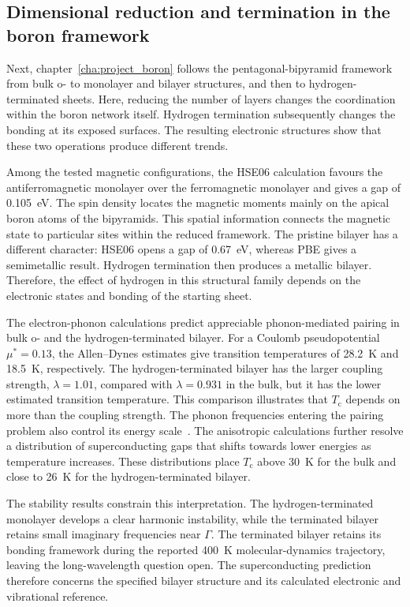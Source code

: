 \FloatBarrier
\subsection{Dimensional reduction and termination in the boron framework}

Next, chapter~\ref{cha:project_boron} follows the pentagonal-bipyramid framework from bulk o- to monolayer and bilayer structures, and then to hydrogen-terminated sheets.
Here, reducing the number of layers changes the coordination within the boron network itself.
Hydrogen termination subsequently changes the bonding at its exposed surfaces.
The resulting electronic structures show that these two operations produce different trends.

Among the tested magnetic configurations, the HSE06 calculation favours the antiferromagnetic monolayer over the ferromagnetic monolayer and gives a gap of \qty{0.105}{\electronvolt}.
The spin density locates the magnetic moments mainly on the apical boron atoms of the bipyramids.
This spatial information connects the magnetic state to particular sites within the reduced framework.
The pristine bilayer has a different character: HSE06 opens a gap of \qty{0.67}{\electronvolt}, whereas PBE gives a semimetallic result.
Hydrogen termination then produces a metallic bilayer.
Therefore, the effect of hydrogen in this structural family depends on the electronic states and bonding of the starting sheet.

The electron-phonon calculations predict appreciable phonon-mediated pairing in bulk o- and the hydrogen-terminated bilayer.
For a Coulomb pseudopotential $\mu^*=0.13$, the Allen--Dynes estimates give transition temperatures of \qty{28.2}{\kelvin} and \qty{18.5}{\kelvin}, respectively.
The hydrogen-terminated bilayer has the larger coupling strength, $\lambda=1.01$, compared with $\lambda=0.931$ in the bulk, but it has the lower estimated transition temperature.
This comparison illustrates that $T_{\mathrm{c}}$ depends on more than the coupling strength.
The phonon frequencies entering the pairing problem also control its energy scale~\cite{allen-dynes}.
The anisotropic calculations further resolve a distribution of superconducting gaps that shifts towards lower energies as temperature increases.
These distributions place $T_{\mathrm{c}}$ above \qty{30}{\kelvin} for the bulk and close to \qty{26}{\kelvin} for the hydrogen-terminated bilayer.

The stability results constrain this interpretation.
The hydrogen-terminated monolayer develops a clear harmonic instability, while the terminated bilayer retains small imaginary frequencies near $\Gamma$.
The terminated bilayer retains its bonding framework during the reported \qty{400}{\kelvin} molecular-dynamics trajectory, leaving the long-wavelength question open.
The superconducting prediction therefore concerns the specified bilayer structure and its calculated electronic and vibrational reference.

